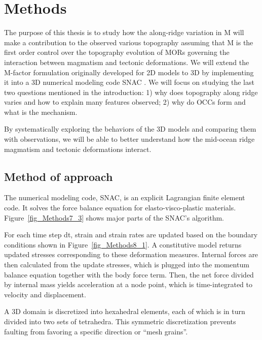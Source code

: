 \pagebreak
\section{Methods}
\label{ch:Methods}
The purpose of this thesis is to study how the along-ridge variation in M will make a contribution to the observed various topography assuming that M is the first order control over the topography evolution of MORs governing the interaction between magmatism and tectonic deformations.
We will extend the M-factor formulation originally developed for 2D models to 3D by implementing it into a 3D numerical modeling code SNAC \citep{Choi2008}. We will focus on studying the last two questions mentioned in the introduction: 1) why does topography along ridge varies and how to explain many features observed; 2) why do OCCs form and what is the mechanism. 

By systematically exploring the behaviors of the 3D models and comparing them with observations, we will be able to better understand  how the mid-ocean ridge magmatism and tectonic deformations interact. 

\subsection{Method of approach}
The numerical modeling code, SNAC, is an explicit Lagrangian finite element code. It solves the force balance equation for elasto-visco-plastic materials. Figure~\ref{fig_Methods7_3} shows major parts of the SNAC's algorithm. 

For each time step dt, strain and strain rates are updated based on the boundary conditions shown in Figure~\ref{fig_Methods8_1}. A constitutive model returns updated stresses corresponding to these deformation measures. Internal forces are then calculated from the update stresses, which is plugged into the momentum balance equation together with the body force term. Then, the net force divided by internal mass yields acceleration at a node point, which is time-integrated to velocity and displacement. 

A 3D domain is discretized into hexahedral elements, each of which is in turn divided into two sets of tetrahedra. This symmetric discretization prevents faulting from favoring a specific direction or ``mesh grains''. 

